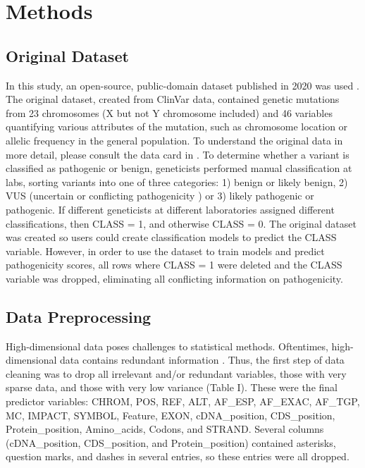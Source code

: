 \documentclass[journal,two side,web]{ieeecolor}
\begin{document}
\section{Methods}

\subsection{Original Dataset}

In this study, an open-source, public-domain dataset published in 2020 was used \cite{kevinarvai_2020}. The original dataset, created from ClinVar data, contained genetic mutations from 23 chromosomes (X but not Y chromosome included) and 46 variables quantifying various attributes of the mutation, such as chromosome location or allelic frequency in the general population. To understand the original data in more detail, please consult the data card in \cite{kevinarvai_2020}. To determine whether a variant is classified as pathogenic or benign, geneticists performed manual classification at labs, sorting variants into one of three categories: 1) benign or likely benign, 2) VUS (uncertain or conflicting pathogenicity \cite{ncidictionary}) or 3) likely pathogenic or pathogenic. If different geneticists at different laboratories assigned different classifications, then CLASS = 1, and otherwise CLASS = 0. The original dataset was created so users could create classification models to predict the CLASS variable. However, in order to use the dataset to train models and predict pathogenicity scores, all rows where CLASS = 1 were deleted and the CLASS variable was dropped, eliminating all conflicting information on pathogenicity.

\subsection{Data Preprocessing}

High-dimensional data poses challenges to statistical methods. Oftentimes, high-dimensional data contains redundant information \cite{sorzano2014survey}. Thus, the first step of data cleaning was to drop all irrelevant and/or redundant variables, those with very sparse data, and those with very low variance (Table I). These were the final predictor variables: CHROM, POS, REF, ALT, AF\_ESP, AF\_EXAC, AF\_TGP, MC, IMPACT, SYMBOL, Feature, EXON, cDNA\_position, CDS\_position, Protein\_position, Amino\_acids, Codons, and STRAND.  Several columns (cDNA\_position, CDS\_position, and Protein\_position) contained asterisks, question marks, and dashes in several entries, so these entries were all dropped. 
\end{document}
